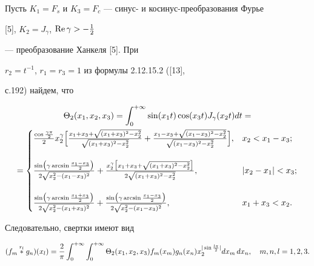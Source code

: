 \begin{exam}


Пусть $K_1=F_s$ и $K_3=F_c$ --- синус- и косинус-преобразования Фурье


[5], $K_2=J_\gamma$, $\operatorname{Re}\gamma>-\frac{1}{2}$


--- преобразование Ханкеля [5]. При


$r_2=t^{-1}$, $r_1=r_3=1$ из формулы 2.12.15.2 ([13],


с.192) найдем, что


\begin{multline*}


\Theta_2(x_1,x_2,x_3)=\int^{+\infty}_0 \sin(x_1t)\cos(x_3t)


J_\gamma(x_2t)dt=\\


=


\begin{cases}


\frac{\cos\frac{\gamma\pi}{2}}{2}x^\gamma_2\Bigl[


\frac{x_1+x_3+\sqrt{(x_1+x_3)^2-x^2_2}}{\sqrt{(x_1+x_3)^2-x^2_2}}+


\frac{x_1-x_3+\sqrt{(x_1-x_3)^2-x^2_2}}


{\sqrt{(x_1-x_3)^2-x^2_2}}\Bigr], & x_2<x_1-x_3;\\


& \\


\frac{\sin\bigl(\gamma\arcsin\frac{x_1-x_3}{2}\bigr)}


{2\sqrt{x^2_2-(x_1-x_3)^2}}+


\frac{x^\gamma_2\bigl[x_1+x_3+\sqrt{(x_1+x_3)^2-x^2_2}\bigr]}


{2\sqrt{(x_1+x_3)^2-x^2_2}}, & |x_2-x_1|<x_3;\\


& \\


\frac{\sin\bigl(\gamma\arcsin\frac{x_1+x_3}{2}\bigr)}


{2\sqrt{x^2_2-(x_1+x_3)^2}}+


\frac{\sin\bigl(\gamma\arcsin\frac{x_1-x_3}{2}\bigr)}


{2\sqrt{x^2_2-(x_1-x_3)^2}}, & x_1+x_3<x_2.


\end{cases}


\end{multline*}


Следовательно, свертки имеют вид


$$


(f_m\up{r_l}{}g_n)(x_l)=\frac{2}{\pi}


\int^{+\infty}_0 \int^{+\infty}_0 \Theta_2(x_1,x_2,x_3)


f_m(x_m)g_n(x_n)x_2^{|\sin\frac{l\pi}{2}|}dx_m\,dx_n,\quad


m,n,l=1,2,3.


$$


\end{exam}





